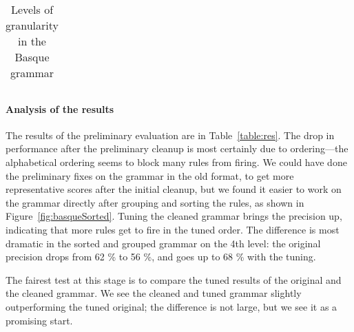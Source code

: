 {{\begin{table}[t]
{\begin{tabular}{llll}
\end{tabular}
}
\caption{Levels of granularity in the Basque grammar}
\label{table:levels}
\end{table}



\paragraph{Analysis of the results}
\label{analysis}

The results of the preliminary evaluation are in
Table~\ref{table:res}.  The drop in performance after the preliminary
cleanup is most certainly due to ordering---the alphabetical ordering
seems to block many rules from firing. We could have done the
preliminary fixes on the grammar in the old format, to get more
representative scores after the initial cleanup, but we found it easier to work
on the grammar directly after grouping and sorting the rules, as shown
in Figure~\ref{fig:basqueSorted}. 
Tuning the cleaned grammar brings the precision up, indicating that
more rules get to fire in the tuned order. The difference is most
dramatic in the sorted and grouped grammar on the 4th level: the
original precision drops from 62 \% to 56 \%, and goes up to 68 \%
with the tuning. 

The fairest test at this stage is to compare the
tuned results of the original and the cleaned grammar.
We see the cleaned and tuned grammar slightly outperforming the tuned original;
the difference is not large, but we see it as a promising start.





}}
